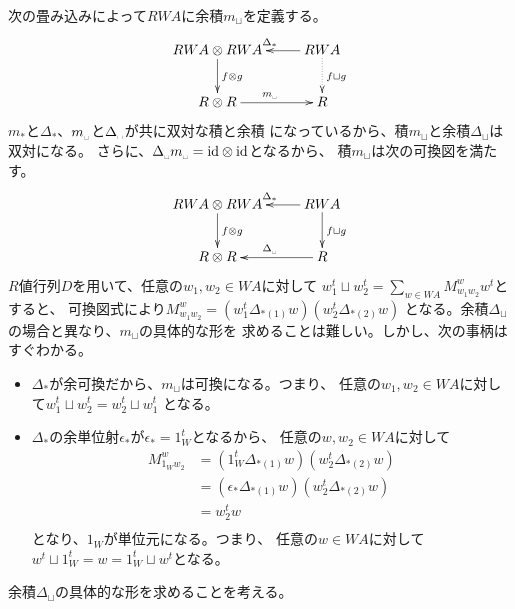 	次の畳み込みによって$RWA$に余積$m_\sqcup$を定義する。
	\begin{equation*}\begin{split} %
		\xymatrix{
			RWA\otimes RWA \ar[d]^{f\otimes g} 
			& RWA \ar[l]_{\Delta_*} \ar@{.>}[d]^{f\sqcup g}\\
			R\otimes R \ar[r]^{m_\myspace} & R  \\
		} 
	\end{split}\end{equation*} %
	$m_*$と$\Delta_*$、$m_\myspace$と$\Delta_\myspace$が共に双対な積と余積
	になっているから、積$m_\sqcup$と余積$\Delta_\sqcup$は双対になる。
	さらに、$\Delta_\myspace m_\myspace=\myid\otimes \myid$となるから、
	積$m_\sqcup$は次の可換図を満たす。
	\begin{equation*}\begin{split} %
		\xymatrix{
			RWA\otimes RWA \ar[d]^{f\otimes g} 
			& RWA \ar[l]_{\Delta_*} \ar[d]^{f\sqcup g}\\
			R\otimes R & R \ar[l]_{\Delta_\myspace} \\
		} 
	\end{split}\end{equation*} %
	$R$値行列$D$を用いて、任意の$w_1,w_2\in WA$に対して
	$w_1^t\sqcup w_2^t=\sum_{w\in WA}M_{w_1w_2}^ww^t$とすると、
	可換図式により$M_{w_1w_2}^w=(w_1^t\Delta_{*(1)}w)(w_2^t\Delta_{*(2)}w)$
	となる。余積$\Delta_\sqcup$の場合と異なり、$m_\sqcup$の具体的な形を
	求めることは難しい。しかし、次の事柄はすぐわかる。
	\begin{itemize}\setlength{\itemsep}{-1mm} %
		\item $\Delta_*$が余可換だから、$m_\sqcup$は可換になる。つまり、
		任意の$w_1,w_2\in WA$に対して$w_1^t\sqcup w_2^t=w_2^t\sqcup w_1^t$
		となる。
		\item $\Delta_*$の余単位射$\epsilon_*$が$\epsilon_*=1_W^t$となるから、
		任意の$w,w_2\in WA$に対して
		\begin{equation*}\begin{split} %
			M_{1_Ww_2}^w &= (1_W^t\Delta_{*(1)}w)(w_2^t\Delta_{*(2)}w) \\
			&= (\epsilon_*\Delta_{*(1)}w)(w_2^t\Delta_{*(2)}w) \\
			&= w_2^tw \\
		\end{split}\end{equation*} %
		となり、$1_W$が単位元になる。つまり、
		任意の$w\in WA$に対して$w^t\sqcup 1_W^t=w=1_W^t\sqcup w^t$となる。
	\end{itemize} %
	余積$\Delta_\sqcup$の具体的な形を求めることを考える。
